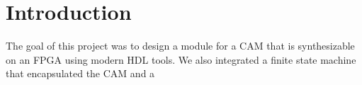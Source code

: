 \section{Introduction}
The goal of this project was to design a module for a CAM that is synthesizable on an FPGA using modern HDL tools. 
We also integrated a finite state machine that encapsulated the CAM and a 